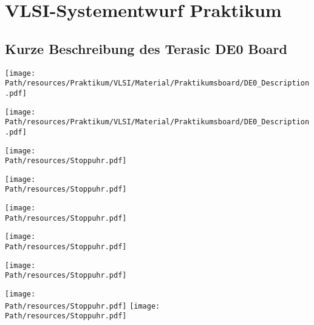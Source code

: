 \chapter{VLSI-Systementwurf Praktikum}
	\section{Kurze Beschreibung des Terasic DE0 Board}
	\begin{center}
	\texttt{[image: \\Path/resources/Praktikum/VLSI/Material/Praktikumsboard/DE0\_Description.pdf]}
	\begin{center}
	\end{center}
	\texttt{[image: \\Path/resources/Praktikum/VLSI/Material/Praktikumsboard/DE0\_Description.pdf]}
	\end{center}
	
	\def \Path {/media/Daten/Studium/Skripte/TechnischeInformatik/resources/Praktikum/VLSI/Abgabe/Protokolle}
	\begin{center}
	\texttt{[image: \\Path/resources/Stoppuhr.pdf]}
	\end{center}
	
	\begin{center}
	\texttt{[image: \\Path/resources/Stoppuhr.pdf]}
	\end{center}
	
	\begin{center}
	\texttt{[image: \\Path/resources/Stoppuhr.pdf]}
	\end{center}
	
	\begin{center}
	\texttt{[image: \\Path/resources/Stoppuhr.pdf]}
	\end{center}
	
	\begin{center}
	\texttt{[image: \\Path/resources/Stoppuhr.pdf]}
	\end{center}
	
	\begin{center}
	\texttt{[image: \\Path/resources/Stoppuhr.pdf]}
	\texttt{[image: \\Path/resources/Stoppuhr.pdf]}
	\end{center}
	
	
	\def \Path {/media/Daten/Studium/Skripte/TechnischeInformatik}


